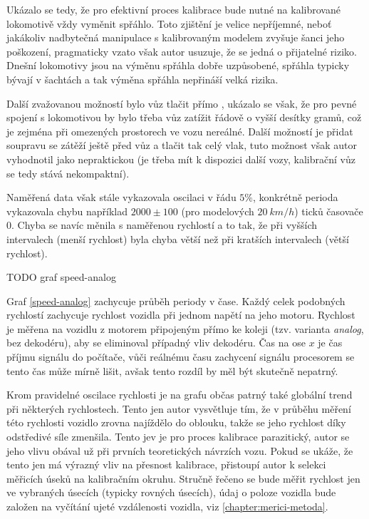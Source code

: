 Ukázalo se tedy, že pro efektivní proces kalibrace bude nutné na kalibrované
lokomotivě vždy vyměnit spřáhlo. Toto zjištění je velice nepříjemné, neboť
jakákoliv nadbytečná manipulace s kalibrovaným modelem zvyšuje šanci jeho
poškození, pragmaticky vzato však autor usuzuje, že se jedná o přijatelné
riziko. Dnešní lokomotivy jsou na výměnu spřáhla dobře uzpůsobené, spřáhla
typicky bývají v šachtách a tak výměna spřáhla nepřináší velká rizika.

Další zvažovanou možností bylo vůz tlačit přímo ,
ukázalo se však, že pro pevné spojení s lokomotivou by bylo třeba vůz zatížit
řádově o vyšší desítky gramů, což je zejména při omezených prostorech ve vozu
nereálné. Další možností je přidat soupravu se zátěží ještě před vůz a tlačit
tak celý vlak, tuto možnost však autor vyhodnotil jako nepraktickou (je třeba
mít k dispozici další vozy, kalibrační vůz se tedy stává nekompaktní).

Naměřená data však stále vykazovala oscilaci v řádu $5 \%$, konkrétně perioda
vykazovala chybu například $2000 \pm 100$ (pro modelových $20\ km/h$) ticků
časovače 0. Chyba se navíc měnila s naměřenou rychlostí a to tak, že při
vyšších intervalech (menší rychlost) byla chyba větší než při kratších
intervalech (větší rychlost).

TODO graf speed-analog

Graf \ref{speed-analog} zachycuje průběh periody v čase. Každý celek podobných
rychlostí zachycuje rychlost vozidla při jednom napětí na jeho motoru. Rychlost
je měřena na vozidlu z motorem připojeným přímo ke koleji (tzv. varianta
\textit{analog}, bez dekodéru), aby se eliminoval případný vliv dekodéru.
Čas na ose $x$ je čas příjmu signálu do počítače, vůči reálnému času zachycení
signálu procesorem se tento čas může mírně lišit, avšak tento rozdíl by měl
být skutečně nepatrný.

Krom pravidelné oscilace rychlosti je na grafu občas patrný také globální
 trend při některých rychlostech. Tento jen autor vysvětluje tím,
že v průběhu měření této rychlosti vozidlo zrovna najíždělo do oblouku, takže
se jeho rychlost díky odstředivé síle zmenšila. Tento jev je pro proces
kalibrace parazitický, autor se jeho vlivu obával už při prvních teoretických
návrzích vozu. Pokud se ukáže, že tento jen má výrazný vliv na přesnost
kalibrace, přistoupí autor k selekci měřicích úseků na kalibračním okruhu.
Stručně řečeno se bude měřit rychlost jen ve vybraných úsecích (typicky rovných
úsecích), údaj o poloze vozidla bude založen na vyčítání ujeté vzdálenosti
vozidla, viz \ref{chapter:merici-metoda}.

